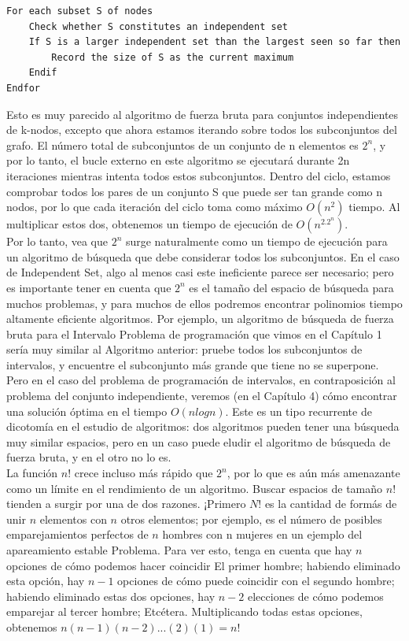 \documentclass[a4paper, 12pt]{book}
\begin{document}
\begin{lstlisting}
For each subset S of nodes
	Check whether S constitutes an independent set
	If S is a larger independent set than the largest seen so far then
		Record the size of S as the current maximum
	Endif
Endfor
\end{lstlisting}

Esto es muy parecido al algoritmo de fuerza bruta para conjuntos independientes de k-nodos, excepto que ahora estamos iterando sobre todos los subconjuntos del grafo. El número total de subconjuntos de un conjunto de n elementos es $2^n$, y por lo tanto, el bucle externo en este algoritmo se ejecutará durante 2n iteraciones mientras intenta todos estos subconjuntos. Dentro del ciclo, estamos comprobar todos los pares de un conjunto S que puede ser tan grande como n nodos, por lo que cada iteración del
ciclo toma como máximo $O(n^2)$ tiempo. Al multiplicar estos dos, obtenemos un tiempo de ejecución de $O(n^2.2^n)$.\\

Por lo tanto, vea que $2^n$ surge naturalmente como un tiempo de ejecución para un algoritmo de búsqueda que debe considerar todos los subconjuntos. En el caso de Independent Set, algo al menos casi este ineficiente parece ser necesario; pero es importante tener en cuenta que $2^n$ es el tamaño del espacio de búsqueda para muchos problemas, y para muchos de ellos podremos encontrar polinomios tiempo altamente eficiente algoritmos. Por ejemplo, un algoritmo de búsqueda de fuerza bruta para el
Intervalo Problema de programación que vimos en el Capítulo 1 sería muy similar al Algoritmo anterior: pruebe todos los subconjuntos de intervalos, y encuentre el subconjunto más grande que tiene no se superpone. Pero en el caso del problema de programación de intervalos, en contraposición al problema del conjunto independiente, veremos (en el Capítulo 4) cómo encontrar una solución óptima en el tiempo $O(n log n)$. Este es un tipo recurrente de dicotomía en el estudio de algoritmos: dos algoritmos pueden tener una búsqueda muy similar espacios, pero en un caso puede eludir el algoritmo de búsqueda de fuerza bruta, y en el otro no lo es.\\

La función $n!$ crece incluso más rápido que $2^n$, por lo que es aún más amenazante como un límite en el rendimiento de un algoritmo. Buscar espacios de tamaño $n!$ tienden a surgir por una de dos razones. ¡Primero $N$! es la cantidad de formás de unir $n$ elementos con $n$ otros elementos; por ejemplo, es el número de posibles emparejamientos perfectos de $n$ hombres con n mujeres en un ejemplo del apareamiento estable Problema. Para ver esto, tenga en cuenta que hay $n$ opciones de cómo podemos hacer coincidir El primer hombre; habiendo eliminado esta opción, hay $n-1$ opciones de cómo puede coincidir con el segundo hombre; habiendo eliminado estas dos opciones, hay $n-2$ elecciones de cómo podemos emparejar al tercer hombre; Etcétera. Multiplicando todas estas opciones, obtenemos $n(n-1)(n-2)...(2)(1)=n!$\\
\end{document}
